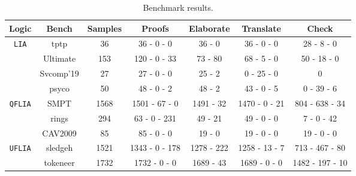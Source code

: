 \begin{table}[t]
\centering
\begin{tabular}{|c|c|c|c|c|c|c|}
\hline                                                             %
\textbf{Logic}                & \textbf{Bench}  & \textbf{Samples} & \textbf{Proofs}       & \textbf{Elaborate} & \textbf{Translate} & \textbf{Check} \\ \hline
\multirow{4}{*}{\tt{LIA}}     & tptp            & 36               &  36 - 0 - 0           &  36 - 0             & 36 - 0 - 0          & 28 - 8 - 0       \\ \cline{2-7} 
                              & Ultimate        & 153              &  120 - 0 - 33         &  73 - 80            & 68 - 5 - 0          & 50 - 18 - 0      \\ \cline{2-7} 
                              & Svcomp'19      & 27               &  27 - 0 - 0           &  25 - 2             & 0 - 25 - 0          & 0                \\ \cline{2-7} 
                              & psyco           & 50               &  48 - 0 - 2           &  48 - 2             & 43 - 0 - 5          & 0 - 39 - 6       \\ \hline
\multirow{2}{*}{\tt{QFLIA}}   & SMPT            & 1568             &  1501 - 67 - 0        &  1491 - 32          & 1470 - 0 - 21       & 804 - 638 - 34   \\ \cline{2-7}
                              & rings           & 294              &  63 - 0 - 231         &  49 - 21            & 49 - 0 - 0          & 7 - 0 - 42       \\ \cline{2-7} 
                              & CAV2009       & 85               &  85 - 0 - 0           &  19 - 0             & 19 - 0 - 0          & 19 - 0 - 0       \\ \hline
\multirow{2}{*}{\tt{UFLIA}}   & sledgeh    & 1521             &  1343 - 0 - 178       &  1278 - 222         & 1258 - 13 - 7       & 713 - 467 - 80   \\ \cline{2-7} 
                              & tokeneer        & 1732             &  1732 - 0 - 0         & 1689 - 43           & 1689 - 0 - 0        & 1482 - 197 - 10  \\ \hline
\end{tabular}
\caption{Benchmark results.}
\label{table:benchmarks-description}
\end{table}


